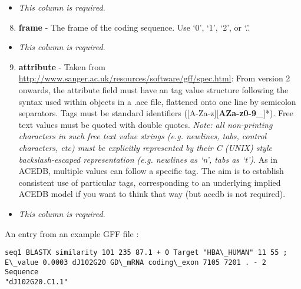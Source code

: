 \documentclass[letterpaper,10pt,english]{sphinxmanual}
\begin{document}
\begin{itemize}
\item {} 
\emph{This column is required}.

\end{itemize}
\begin{enumerate}
\setcounter{enumi}{7}
\item {} 
\textbf{frame} -  The frame of the coding sequence. Use `0', `1', `2', or `.'.

\end{enumerate}
\begin{itemize}
\item {} 
\emph{This column is required}.

\end{itemize}
\begin{enumerate}
\setcounter{enumi}{8}
\item {} 
\textbf{attribute} - Taken from \href{http://www.sanger.ac.uk/resources/software/gff/spec.html}{http://www.sanger.ac.uk/resources/software/gff/spec.html}: From version 2 onwards, the attribute field must have an tag value structure following the syntax used within objects in a .ace file, flattened onto one line by semicolon separators. Tags must be standard identifiers ({[}A-Za-z{]}{[}{\color{red}\bfseries{}AZa-z0-9\_}{]}*). Free text values must be quoted with double quotes. \emph{Note: all non-printing characters in such free text value strings (e.g. newlines, tabs, control characters, etc) must be explicitly represented by their C (UNIX) style backslash-escaped representation (e.g. newlines as `n', tabs as `t')}. As in ACEDB, multiple values can follow a specific tag. The aim is to establish consistent use of particular tags, corresponding to an underlying implied ACEDB model if you want to think that way (but acedb is not required).

\end{enumerate}
\begin{itemize}
\item {} 
\emph{This column is required}.

\end{itemize}

An entry from an example GFF file :

\begin{Verbatim}[commandchars=\\\{\}]
seq1 BLASTX similarity 101 235 87.1 + 0 Target "HBA\_HUMAN" 11 55 ;
E\_value 0.0003 dJ102G20 GD\_mRNA coding\_exon 7105 7201 . - 2 Sequence
"dJ102G20.C1.1"
\end{Verbatim}
\end{document}
